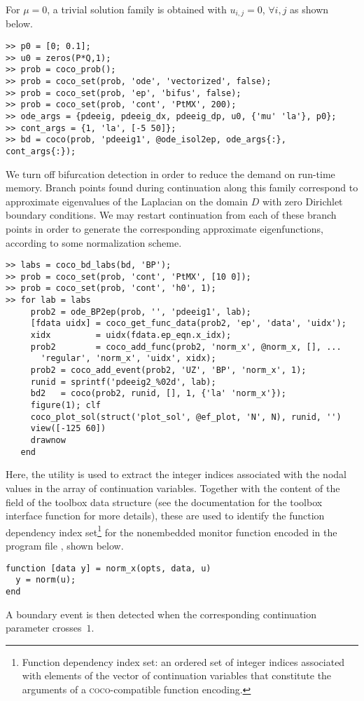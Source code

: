 For $\mu=0$, a trivial solution family is obtained with $u_{i,j}=0$, $\forall i,j$ as shown below. 
\begin{lstlisting}[language=coco-highlight]
>> p0 = [0; 0.1];
>> u0 = zeros(P*Q,1);
>> prob = coco_prob();
>> prob = coco_set(prob, 'ode', 'vectorized', false);
>> prob = coco_set(prob, 'ep', 'bifus', false);
>> prob = coco_set(prob, 'cont', 'PtMX', 200);
>> ode_args = {pdeeig, pdeeig_dx, pdeeig_dp, u0, {'mu' 'la'}, p0};
>> cont_args = {1, 'la', [-5 50]};
>> bd = coco(prob, 'pdeeig1', @ode_isol2ep, ode_args{:}, cont_args{:});
\end{lstlisting}
We turn off bifurcation detection in order to reduce the demand on run-time memory. Branch points found during continuation along this family correspond to approximate eigenvalues of the Laplacian on the domain $D$ with zero Dirichlet boundary conditions. We may restart continuation from each of these branch points in order to generate the corresponding approximate eigenfunctions, according to some normalization scheme.
\begin{lstlisting}[language=coco-highlight]
>> labs = coco_bd_labs(bd, 'BP');
>> prob = coco_set(prob, 'cont', 'PtMX', [10 0]);
>> prob = coco_set(prob, 'cont', 'h0', 1);
>> for lab = labs
     prob2 = ode_BP2ep(prob, '', 'pdeeig1', lab);
     [fdata uidx] = coco_get_func_data(prob2, 'ep', 'data', 'uidx');
     xidx         = uidx(fdata.ep_eqn.x_idx);
     prob2        = coco_add_func(prob2, 'norm_x', @norm_x, [], ...
       'regular', 'norm_x', 'uidx', xidx);
     prob2 = coco_add_event(prob2, 'UZ', 'BP', 'norm_x', 1);
     runid = sprintf('pdeeig2_%02d', lab);
     bd2   = coco(prob2, runid, [], 1, {'la' 'norm_x'});
     figure(1); clf
     coco_plot_sol(struct('plot_sol', @ef_plot, 'N', N), runid, '')
     view([-125 60])
     drawnow
   end
\end{lstlisting}
Here, the  utility is used to extract the integer indices associated with the nodal values in the array of continuation variables. Together with the content of the  field of the  toolbox data structure (see the documentation for the  toolbox interface function for more details), these are used to identify the function dependency index set\footnote{Function dependency index set: an ordered set of integer indices associated with elements of the vector of continuation variables that constitute the arguments of a \textsc{coco}-compatible function encoding.} for the nonembedded monitor function  encoded in the program file , shown below. 
\begin{lstlisting}[language=coco-highlight]
function [data y] = norm_x(opts, data, u)
  y = norm(u);
end
\end{lstlisting}
A boundary event is then detected when the corresponding continuation parameter crosses~$1$.

